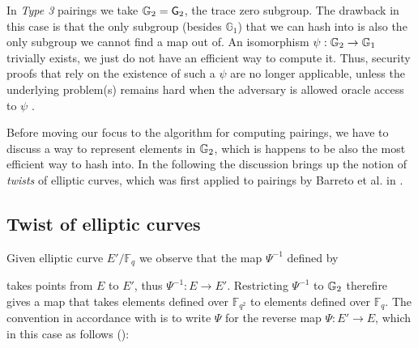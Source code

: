 In \textit{Type 3} pairings we take $\mathbb{G}_2 = \mathsf{G}_2$, the
trace zero subgroup. The drawback in this case is that the only
subgroup (besides $\mathbb{G}_1$) that we can hash into is also the only
subgroup we cannot find a map out of. An isomorphism $\psi : \mathbb{G}_2 \to \mathbb{G}_1$
trivially exists, we just do not have an efficient way to compute it. Thus,
security proofs that rely on the existence of such a $\psi$ are no longer
applicable, unless the underlying problem(s) remains hard when the adversary
is allowed oracle access to $\psi$ \cite{SV07}.

Before moving our focus to the algorithm for computing pairings, we have to discuss a way to represent elements in $\mathbb{G}_2$, which is happens to be also the most efficient way to hash into. In the following  the discussion brings up the notion of \emph{twists} of elliptic curves, which was first applied to pairings by Barreto et al.  in \cite{BLS03}.

\subsection{Twist of elliptic curves}
\label{ssec:ch1.ellipticcurvespairinggroups.twistedcurves}





Given elliptic curve $E'/\mathbb{F}_q$ we observe that the map $\Psi^{-1}$ defined by 


\noindent takes points from $E$ to $E'$, thus $\Psi^{-1} : E \to E'$. Restricting $\Psi^{-1}$ to $\mathbb{G}_2$ therefire gives a map that takes elements defined over $\mathbb{F}_{q^2}$ to elements defined over $\mathbb{F}_q$. The convention in accordance with \cite{theory.pairings.for.beginners} is to write $\Psi$ for the reverse map $\Psi : E' \to E$, which in this case as follows (): 



